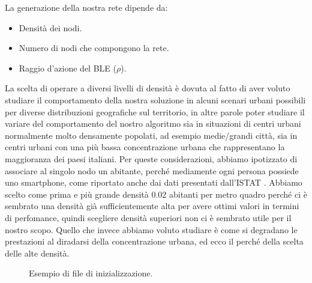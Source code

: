 \begin{flushleft}
	La generazione della nostra rete dipende da:
\end{flushleft}
\begin{itemize}
	\item Densità dei nodi.
	\item Numero di nodi che compongono la rete.
	\item Raggio d'azione del \acs{BLE} (\textit{$\rho$}).
\end{itemize}
La scelta di operare a diversi livelli di densità è dovuta al fatto di aver voluto studiare il comportamento della nostra soluzione in alcuni scenari urbani possibili per diverse distribuzioni geografiche sul territorio, in altre parole poter studiare il variare del comportamento del nostro algoritmo sia in situazioni di centri urbani normalmente molto densamente popolati, ad esempio medie/grandi città, sia in centri urbani con una più bassa concentrazione urbana che rappresentano la maggioranza dei paesi italiani.
Per queste considerazioni, abbiamo ipotizzato di associare al singolo nodo un abitante, perché mediamente ogni persona possiede uno smartphone, come riportato anche dai dati presentati dall'ISTAT \cite{istat2014}. Abbiamo scelto come prima e più grande densità 0.02 abitanti per metro quadro perché ci è sembrato una densità già sufficientemente alta per avere ottimi valori in termini di perfomance, quindi scegliere densità superiori non ci è sembrato utile per il nostro scopo. Quello che invece abbiamo voluto studiare è come si degradano le prestazioni al diradarsi della concentrazione urbana, ed ecco il perché della scelta delle alte densità.
\bigskip
\begin{figure}[t]
	\hfill
	\caption{Esempio di file di inizializzazione.}
	\label{fig:rgg_gen_02}
\end{figure}
